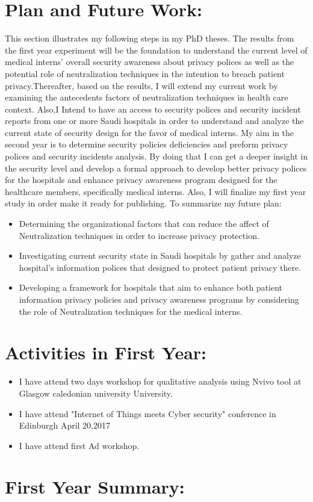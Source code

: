 \section{Plan and Future Work:}
This section illustrates my following steps in my PhD theses. The results from the first year experiment will be the foundation to understand the current level of medical interns' overall security awareness about privacy polices as well as the potential role of neutralization techniques in the intention to breach patient privacy.Thereafter, based on the results, I will extend my current work by examining the antecedents factors of neutralization techniques in health care context. Also,I Intend to have an access to security  polices and security incident reports from one or more Saudi hospitals in order to understand and analyze the current state of security design for the favor of medical interns. My aim in the second year is to determine security policies deficiencies and preform privacy polices and security incidents analysis. By doing that I can get a deeper insight in the security level and develop a formal approach to develop better privacy polices for the hospitals and enhance privacy awareness program designed for the healthcare members, specifically medical interns. Also, I will finalize my first year study in order make it ready for publishing. To summarize my future plan:
\begin{itemize}
	\item Determining the organizational factors that can reduce the affect of Neutralization techniques in order to increase privacy protection.  
	 \item Investigating current security state in Saudi hospitals by gather and analyze hospital's information polices that designed to protect patient privacy there.
	 \item Developing a framework for hospitals that aim to enhance both patient information privacy policies and privacy awareness programs by considering the role of Neutralization techniques for the medical interns.
\end{itemize}
  
\section{Activities in First Year:}

\begin{itemize}
	\item I have attend two days workshop for qualitative analysis using Nvivo tool at Glasgow caledonian university University.
	\item I have attend "Internet of Things meets Cyber security" conference in Edinburgh April 20,2017
	\item I have attend first Ad workshop.
\end{itemize}

\section{First Year Summary:}
